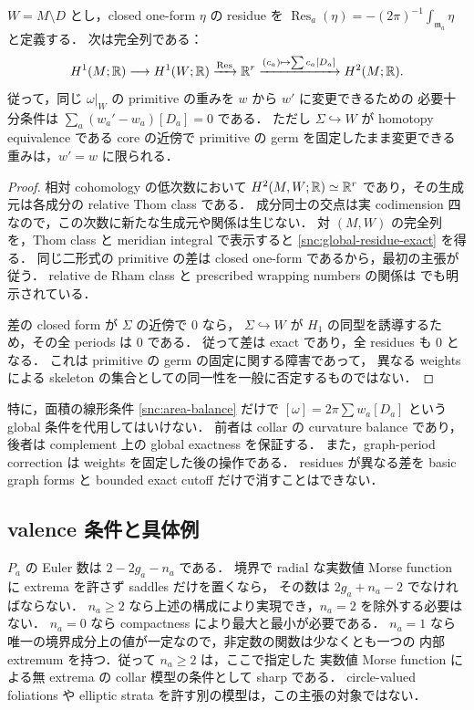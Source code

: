\begin{proposition}
\label{snc:residue-change}
$W=M\setminus D$ とし，closed one-form $\eta$ の residue を
$\operatorname{Res}_a(\eta)=-(2\pi)^{-1}\int_{\mathfrak m_a}\eta$ と定義する．
次は完全列である：
\begin{equation}\label{snc:global-residue-exact}
 H^1(M;\mathbb R)\longrightarrow H^1(W;\mathbb R)
 \xrightarrow{\operatorname{Res}}\mathbb R^r
 \xrightarrow{(c_a)\mapsto\sum c_a[D_a]} H^2(M;\mathbb R).
\end{equation}
従って，同じ $\omega|_W$ の primitive の重みを $w$ から $w'$ に変更できるための
必要十分条件は $\sum_a(w_a'-w_a)[D_a]=0$ である．
ただし $\Sigma\hookrightarrow W$ が homotopy equivalence である core の近傍で
primitive の germ を固定したまま変更できる重みは，$w'=w$ に限られる．
\end{proposition}
\begin{proof}
相対 cohomology の低次数において
$H^2(M,W;\mathbb R)\simeq\mathbb R^r$ であり，その生成元は各成分の relative Thom class である．
成分同士の交点は実 codimension 四なので，この次数に新たな生成元や関係は生じない．
対 $(M,W)$ の完全列を，Thom class と meridian integral で表示すると
\eqref{snc:global-residue-exact} を得る．
同じ二形式の primitive の差は closed one-form であるから，最初の主張が従う．
relative de Rham class と prescribed wrapping numbers の関係は
\cite[\S1.1, Proposition 2.10]{BSV}でも明示されている．

差の closed form が $\Sigma$ の近傍で $0$ なら，
$\Sigma\hookrightarrow W$ が $H_1$ の同型を誘導するため，その全 periods は $0$ である．
従って差は exact であり，全 residues も $0$ となる．
これは primitive の germ の固定に関する障害であって，
異なる weights による skeleton の集合としての同一性を一般に否定するものではない．
\end{proof}

特に，面積の線形条件 \eqref{snc:area-balance} だけで
$[\omega]=2\pi\sum w_a[D_a]$ という global 条件を代用してはいけない．
前者は collar の curvature balance であり，後者は complement 上の global exactness を保証する．
また，graph-period correction は weights を固定した後の操作である．
residues が異なる差を basic graph forms と bounded exact cutoff だけで消すことはできない．

\subsection{valence 条件と具体例}

$P_a$ の Euler 数は $2-2g_a-n_a$ である．
境界で radial な実数値 Morse function に extrema を許さず saddles だけを置くなら，
その数は $2g_a+n_a-2$ でなければならない．
$n_a\geq2$ なら上述の構成により実現でき，$n_a=2$ を除外する必要はない．
$n_a=0$ なら compactness により最大と最小が必要である．
$n_a=1$ なら唯一の境界成分上の値が一定なので，非定数の関数は少なくとも一つの
内部 extremum を持つ．従って $n_a\geq2$ は，ここで指定した
実数値 Morse function による無 extrema の collar 模型の条件として sharp である．
circle-valued foliations や elliptic strata を許す別の模型は，この主張の対象ではない．

